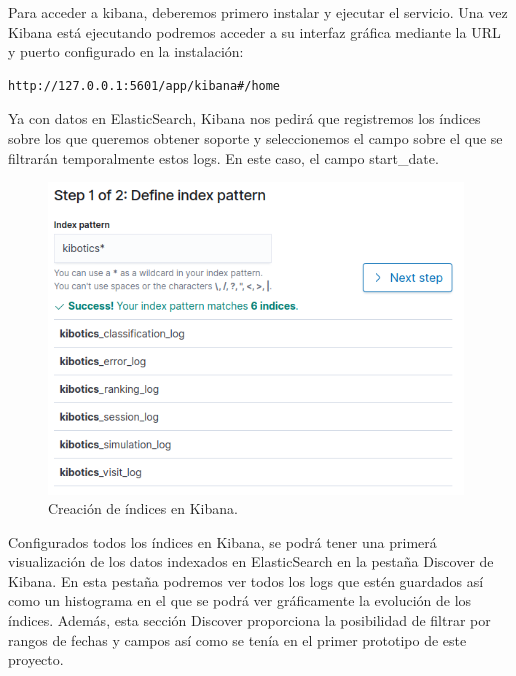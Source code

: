 \documentclass[11pt,a4paper]{book}
\begin{document}
				Para acceder a kibana, deberemos primero instalar y ejecutar el servicio. Una vez Kibana está ejecutando podremos acceder a su interfaz gráfica mediante la URL y puerto configurado en la instalación:
				
				\begin{Verbatim}[tabsize=4]	
http://127.0.0.1:5601/app/kibana#/home
				\end{Verbatim}
				
				Ya con datos en ElasticSearch, Kibana nos pedirá que registremos los índices sobre los que queremos obtener soporte y seleccionemos el campo sobre el que se filtrarán temporalmente estos logs. En este caso, el campo start\_date.

				\begin{figure}[H]
					\centering
					\includegraphics[width=11cm, keepaspectratio]{img/index_pattern_kibana.png}
					\caption{Creación de índices en Kibana.}
					\label{fig:index_pattern_kibana}
				\end{figure}
			
				Configurados todos los índices en Kibana, se podrá tener una primerá visualización de los datos indexados en ElasticSearch en la pestaña Discover de Kibana. En esta pestaña podremos ver todos los logs que estén guardados así como un histograma en el que se podrá ver gráficamente la evolución de los índices. Además, esta sección Discover proporciona la posibilidad de filtrar por rangos de fechas y campos así como se tenía en el primer prototipo de este proyecto.\\
				
\end{document}
